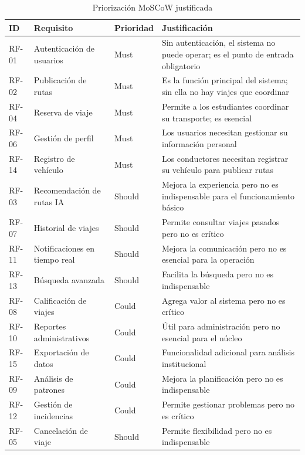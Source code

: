 \documentclass[11pt,a4paper]{article}
\begin{document}
\begin{table}[h]
    \centering
    \caption{Priorización MoSCoW justificada}
    \label{tab:moscow}
    \vspace{6pt}
    \begin{tabularx}{\textwidth}{|l|X|X|X|}
    \hline
    \textbf{ID} & \textbf{Requisito} & \textbf{Prioridad} & \textbf{Justificación} \\
    \hline
    RF-01 & Autenticación de usuarios & Must & Sin autenticación, el sistema no puede operar; es el punto de entrada obligatorio \\
    \hline
    RF-02 & Publicación de rutas & Must & Es la función principal del sistema; sin ella no hay viajes que coordinar \\
    \hline
    RF-04 & Reserva de viaje & Must & Permite a los estudiantes coordinar su transporte; es esencial \\
    \hline
    RF-06 & Gestión de perfil & Must & Los usuarios necesitan gestionar su información personal \\
    \hline
    RF-14 & Registro de vehículo & Must & Los conductores necesitan registrar su vehículo para publicar rutas \\
    \hline
    RF-03 & Recomendación de rutas IA & Should & Mejora la experiencia pero no es indispensable para el funcionamiento básico \\
    \hline
    RF-07 & Historial de viajes & Should & Permite consultar viajes pasados pero no es crítico \\
    \hline
    RF-11 & Notificaciones en tiempo real & Should & Mejora la comunicación pero no es esencial para la operación \\
    \hline
    RF-13 & Búsqueda avanzada & Should & Facilita la búsqueda pero no es indispensable \\
    \hline
    RF-08 & Calificación de viajes & Could & Agrega valor al sistema pero no es crítico \\
    \hline
    RF-10 & Reportes administrativos & Could & Útil para administración pero no esencial para el núcleo \\
    \hline
    RF-15 & Exportación de datos & Could & Funcionalidad adicional para análisis institucional \\
    \hline
    RF-09 & Análisis de patrones & Could & Mejora la planificación pero no es indispensable \\
    \hline
    RF-12 & Gestión de incidencias & Could & Permite gestionar problemas pero no es crítico \\
    \hline
    RF-05 & Cancelación de viaje & Should & Permite flexibilidad pero no es indispensable \\
    \hline
    \end{tabularx}
\end{table}
\end{document}
